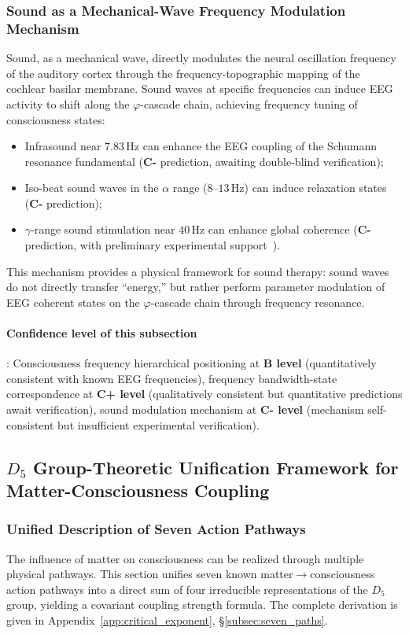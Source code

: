 \documentclass[12pt,a4paper,twocolumn]{article}
\renewcommand{\phi}{\varphi}
\begin{document}
\subsubsection{Sound as a Mechanical-Wave Frequency Modulation Mechanism}
\label{subsec:sound_modulation}
Sound, as a mechanical wave, directly modulates the neural oscillation frequency of the auditory cortex through the frequency-topographic mapping of the cochlear basilar membrane. Sound waves at specific frequencies can induce EEG activity to shift along the $\phi$-cascade chain, achieving frequency tuning of consciousness states:
\begin{itemize}
\item Infrasound near $7.83$\,Hz can enhance the EEG coupling of the Schumann resonance fundamental (\textbf{C-} prediction, awaiting double-blind verification);
\item Iso-beat sound waves in the $\alpha$ range ($8$--$13$\,Hz) can induce relaxation states (\textbf{C-} prediction);
\item $\gamma$-range sound stimulation near $40$\,Hz can enhance global coherence (\textbf{C-} prediction, with preliminary experimental support~\cite{Zhu2025}).
\end{itemize}
This mechanism provides a physical framework for sound therapy: sound waves do not directly transfer ``energy,'' but rather perform parameter modulation of EEG coherent states on the $\phi$-cascade chain through frequency resonance.

\paragraph{Confidence level of this subsection}: Consciousness frequency hierarchical positioning at \textbf{B level} (quantitatively consistent with known EEG frequencies), frequency bandwidth-state correspondence at \textbf{C+ level} (qualitatively consistent but quantitative predictions await verification), sound modulation mechanism at \textbf{C- level} (mechanism self-consistent but insufficient experimental verification).

\subsection{$D_5$ Group-Theoretic Unification Framework for Matter-Consciousness Coupling}
\label{subsec:d5_seven_paths}

\subsubsection{Unified Description of Seven Action Pathways}
The influence of matter on consciousness can be realized through multiple physical pathways. This section unifies seven known matter$\to$consciousness action pathways into a direct sum of four irreducible representations of the $D_5$ group, yielding a covariant coupling strength formula. The complete derivation is given in Appendix~\ref{app:critical_exponent}, \S\ref{subsec:seven_paths}.
\end{document}
